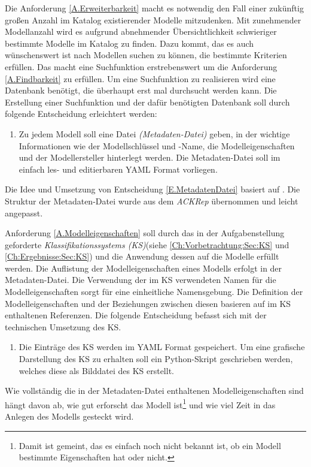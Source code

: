 Die Anforderung \ref{A.Erweiterbarkeit} macht es notwendig den Fall einer zukünftig großen Anzahl im Katalog existierender Modelle mitzudenken. Mit zunehmender Modellanzahl wird es aufgrund abnehmender Übersichtlichkeit schwieriger bestimmte Modelle im Katalog zu finden. Dazu kommt, das es auch wünschenswert ist nach Modellen suchen zu können, die bestimmte Kriterien erfüllen. Das macht eine Suchfunktion erstrebenswert um die Anforderung \ref{A.Findbarkeit} zu erfüllen. Um eine Suchfunktion zu realisieren wird eine Datenbank benötigt, die überhaupt erst mal durchsucht werden kann. Die Erstellung einer Suchfunktion und der dafür benötigten Datenbank soll durch folgende Entscheidung erleichtert werden:
\begin{enumerate}[label=\textbf{Entscheidung E.\arabic*}:, ref=\textbf{E.\arabic*}, wide=0pt, leftmargin=*]
	\item \label{E.MetadatenDatei}Zu jedem Modell soll eine Datei \textit{(Metadaten-Datei)} geben, in der wichtige Informationen wie der Modellschlüssel und -Name, die Modelleigenschaften und der Modellersteller hinterlegt werden. Die Metadaten-Datei soll im einfach les- und editierbaren YAML Format vorliegen.
\end{enumerate}
Die Idee und Umsetzung von Entscheidung \ref{E.MetadatenDatei} basiert auf \cite{KNHE20a}. Die Struktur der Metadaten-Datei wurde aus dem \textit{ACKRep} übernommen und leicht angepasst.

Anforderung \ref{A.Modelleigenschaften} soll durch das in der Aufgabenstellung geforderte \textit{Klassifikationssystems (KS)}(siehe \autoref{Ch:Vorbetrachtung:Sec:KS} und \autoref{Ch:Ergebnisse:Sec:KS}) und die Anwendung dessen auf die Modelle erfüllt werden. Die Auflistung der Modelleigenschaften eines Modells erfolgt in der Metadaten-Datei. Die Verwendung der im KS verwendeten Namen für die Modelleigenschaften sorgt für eine einheitliche Namensgebung. Die Definition der Modelleigenschaften und der Beziehungen zwischen diesen basieren auf im KS enthaltenen Referenzen. Die folgende Entscheidung befasst sich mit der technischen Umsetzung des KS.
\begin{enumerate}[resume*]
	\item \label{E.KS_TechUmsetzung}Die Einträge des KS werden im YAML Format gespeichert. Um eine grafische Darstellung des KS zu erhalten soll ein Python-Skript geschrieben werden, welches diese als Bilddatei des KS erstellt.
\end{enumerate}
Wie vollständig die in der Metadaten-Datei enthaltenen Modelleigenschaften sind hängt davon ab, wie gut erforscht das Modell ist\footnote{Damit ist gemeint, das es einfach noch nicht bekannt ist, ob ein Modell bestimmte Eigenschaften hat oder nicht.} und wie viel Zeit in das Anlegen des Modells gesteckt wird.

